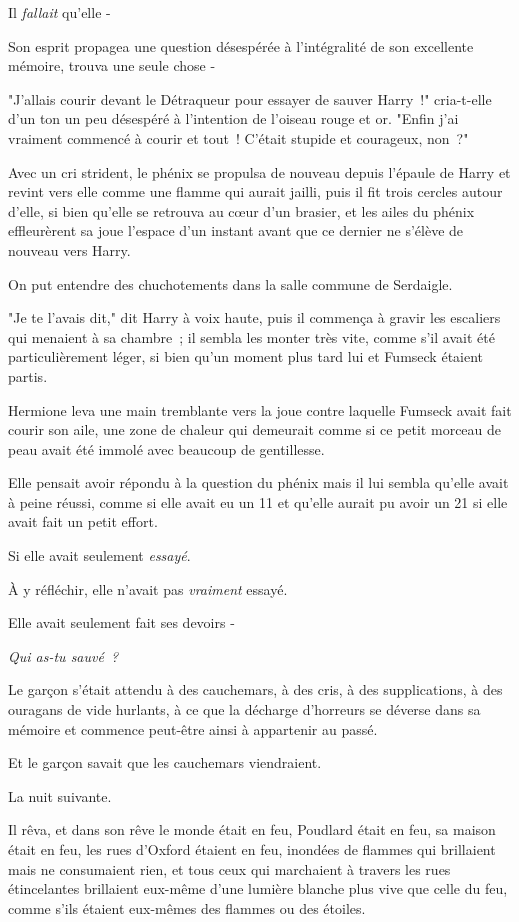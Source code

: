 Il \emph{fallait} qu'elle -

Son esprit propagea une question désespérée à l'intégralité de son excellente mémoire, trouva une seule chose -

"J'allais courir devant le Détraqueur pour essayer de sauver Harry~!" cria-t-elle d'un ton un peu désespéré à l'intention de l'oiseau rouge et or. "Enfin j'ai vraiment commencé à courir et tout~! C'était stupide et courageux, non~?"

Avec un cri strident, le phénix se propulsa de nouveau depuis l'épaule de Harry et revint vers elle comme une flamme qui aurait jailli, puis il fit trois cercles autour d'elle, si bien qu'elle se retrouva au cœur d'un brasier, et les ailes du phénix effleurèrent sa joue l'espace d'un instant avant que ce dernier ne s'élève de nouveau vers Harry.

On put entendre des chuchotements dans la salle commune de Serdaigle.

"Je te l'avais dit," dit Harry à voix haute, puis il commença à gravir les escaliers qui menaient à sa chambre~; il sembla les monter très vite, comme s'il avait été particulièrement léger, si bien qu'un moment plus tard lui et Fumseck étaient partis.

Hermione leva une main tremblante vers la joue contre laquelle Fumseck avait fait courir son aile, une zone de chaleur qui demeurait comme si ce petit morceau de peau avait été immolé avec beaucoup de gentillesse.

Elle pensait avoir répondu à la question du phénix mais il lui sembla qu'elle avait à peine réussi, comme si elle avait eu un 11 et qu'elle aurait pu avoir un 21 si elle avait fait un petit effort.

Si elle avait seulement \emph{essayé}.

À y réfléchir, elle n'avait pas \emph{vraiment} essayé.

Elle avait seulement fait ses devoirs -

\emph{Qui as-tu sauvé~?}


Le garçon s'était attendu à des cauchemars, à des cris, à des supplications, à des ouragans de vide hurlants, à ce que la décharge d'horreurs se déverse dans sa mémoire et commence peut-être ainsi à appartenir au passé.

Et le garçon savait que les cauchemars viendraient.

La nuit suivante.

Il rêva, et dans son rêve le monde était en feu, Poudlard était en feu, sa maison était en feu, les rues d'Oxford étaient en feu, inondées de flammes qui brillaient mais ne consumaient rien, et tous ceux qui marchaient à travers les rues étincelantes brillaient eux-même d'une lumière blanche plus vive que celle du feu, comme s'ils étaient eux-mêmes des flammes ou des étoiles.

